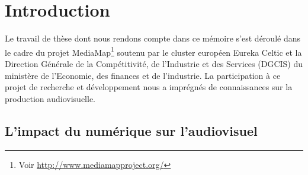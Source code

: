 


\chapter{Introduction}\label{chap:intro}
\minitoc

Le travail de thèse dont nous rendons compte dans ce mémoire s'est déroulé dans le cadre du projet MediaMap\footnote{Voir \url{http://www.mediamapproject.org/}} soutenu par le cluster européen Eureka Celtic et la Direction Générale de la Compétitivité, de l'Industrie et
des Services (DGCIS) du ministère de l'Economie, des finances et de l'industrie.
La participation à ce projet de recherche et développement nous a imprégnés de connaissances sur la production audiovisuelle.





\section{L'impact du numérique sur l'audiovisuel}\label{sec:motiv}

